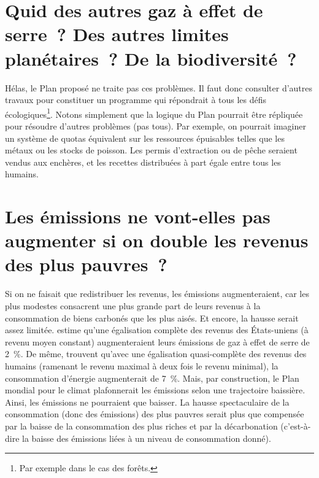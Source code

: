 \documentclass[a5paper,french,openany]{memoir}
\begin{document}
\section*{\normalsize Quid des autres gaz à effet de serre~? Des autres limites planétaires~? De la biodiversité~?}\label{q:scope}

Hélas, le Plan proposé ne traite pas ces problèmes. Il faut donc consulter d'autres travaux pour constituer un programme qui répondrait à tous les défis écologiques\footnote{Par exemple \citet{strassburg_reducing_2009,karsenty_geopolitique_2021} dans le cas des forêts.}. %
Notons simplement que la logique du Plan pourrait être répliquée pour résoudre d'autres problèmes (pas tous). Par exemple, on pourrait imaginer un système de quotas équivalent sur les ressources épuisables telles que les métaux ou les stocks de poisson. Les permis d'extraction %
ou de pêche seraient vendus aux enchères, et les recettes distribuées à part égale entre tous les humains.

\section*{\normalsize Les émissions ne vont-elles pas augmenter si on double les revenus des plus pauvres~?}\label{q:emissions}

Si on ne faisait que redistribuer les revenus, les émissions augmenteraient, car les plus modestes consacrent une plus grande part de leurs revenus à la consommation de biens carbonés que les plus aisés. Et encore, la hausse serait assez limitée. \cite{sager_income_2019} estime qu'une égalisation complète des revenus des États-uniens (à revenu moyen constant) augmenteraient leurs émissions de gaz à effet de serre de 2~\%. De même, \cite{oswald_global_2021} trouvent qu'avec une égalisation quasi-complète des revenus des humains (ramenant le revenu maximal à deux fois le revenu minimal), la consommation d'énergie augmenterait de 7~\%. 
Mais, par construction, le Plan mondial pour le climat plafonnerait les émissions selon une trajectoire baissière. Ainsi, les émissions ne pourraient que baisser. La hausse spectaculaire de la consommation (donc des émissions) des plus pauvres serait plus que compensée par la baisse de la consommation des plus riches et par la décarbonation (c'est-à-dire la baisse des émissions liées à un niveau de consommation donné).
\end{document}
